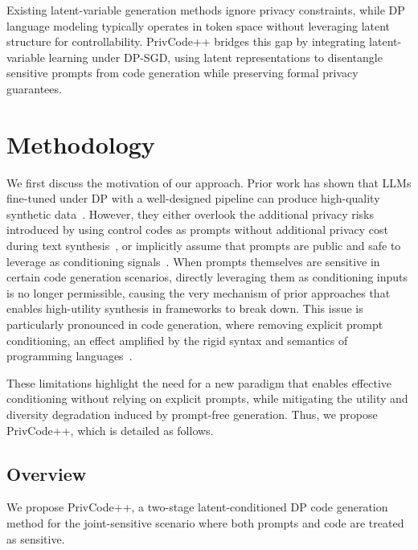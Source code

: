 \documentclass{article}
\theoremstyle{plain}
\theoremstyle{definition}
\theoremstyle{remark}
\def \toolname{PrivCode++}
\begin{document}
Existing latent-variable generation methods ignore privacy constraints, while DP language modeling typically operates in token space without leveraging latent structure for controllability. PrivCode++ bridges this gap by integrating latent-variable learning under DP-SGD, using latent representations to disentangle sensitive prompts from code generation while preserving formal privacy guarantees.




\section{Methodology}





    


We first discuss the motivation of our approach.
Prior work has shown that LLMs fine-tuned under DP  with a well-designed pipeline can produce high-quality synthetic data~\cite{yue2023synthetic, liu2025privcode}. However, they either overlook the additional privacy risks introduced by using control codes as prompts without additional privacy cost during text synthesis~\cite{yue2023synthetic}, or implicitly assume that prompts are public and safe to leverage as conditioning signals~\cite{liu2025privcode}. When prompts themselves are sensitive in certain code generation scenarios, directly leveraging them as conditioning inputs is no longer permissible, causing the very mechanism of prior approaches that enables high-utility synthesis in frameworks to break down. This issue is particularly pronounced in code generation, where removing explicit prompt conditioning, an effect amplified by the rigid syntax and semantics of programming languages~\cite{zan2023large}. 

These limitations highlight the need for a new paradigm that enables effective conditioning without relying on explicit prompts, while mitigating the utility and diversity degradation induced by prompt-free generation. Thus, we propose \toolname{}, which is detailed as follows.


\subsection{Overview}

\label{sec:overview}



We propose \toolname{}, a two-stage latent-conditioned DP code generation method for the joint-sensitive scenario where both prompts and code are treated as sensitive.
\end{document}
